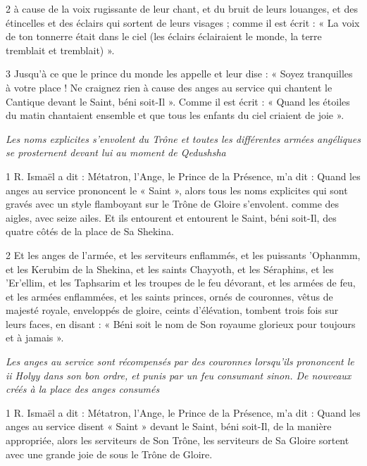 \par 2 à cause de la voix rugissante de leur chant, et du bruit de leurs louanges, et des étincelles et des éclairs qui sortent de leurs visages ; comme il est écrit : « La voix de ton tonnerre était dans le ciel (les éclairs éclairaient le monde, la terre tremblait et tremblait) ».

\par 3 Jusqu'à ce que le prince du monde les appelle et leur dise : « Soyez tranquilles à votre place ! Ne craignez rien à cause des anges au service qui chantent le Cantique devant le Saint, béni soit-Il ». Comme il est écrit : « Quand les étoiles du matin chantaient ensemble et que tous les enfants du ciel criaient de joie ».




\par \textit{Les noms explicites s'envolent du Trône et toutes les différentes armées angéliques se prosternent devant lui au moment de Qedushsha}

\par 1 R. Ismaël a dit : Métatron, l'Ange, le Prince de la Présence, m'a dit : Quand les anges au service prononcent le « Saint », alors tous les noms explicites qui sont gravés avec un style flamboyant sur le Trône de Gloire s'envolent. comme des aigles, avec seize ailes. Et ils entourent et entourent le Saint, béni soit-Il, des quatre côtés de la place de Sa Shekina.

\par 2 Et les anges de l'armée, et les serviteurs enflammés, et les puissants 'Ophanmm, et les Kerubim de la Shekina, et les saints Chayyoth, et les Séraphins, et les 'Er'ellim, et les Taphsarim et les troupes de le feu dévorant, et les armées de feu, et les armées enflammées, et les saints princes, ornés de couronnes, vêtus de majesté royale, enveloppés de gloire, ceints d'élévation, tombent trois fois sur leurs faces, en disant : « Béni soit le nom de Son royaume glorieux pour toujours et à jamais ».



\par \textit{Les anges au service sont récompensés par des couronnes lorsqu'ils prononcent le ii Holyy dans son bon ordre, et punis par un feu consumant sinon. De nouveaux créés à la place des anges consumés}

\par 1 R. Ismaël a dit : Métatron, l'Ange, le Prince de la Présence, m'a dit : Quand les anges au service disent « Saint » devant le Saint, béni soit-Il, de la manière appropriée, alors les serviteurs de Son Trône, les serviteurs de Sa Gloire sortent avec une grande joie de sous le Trône de Gloire.

